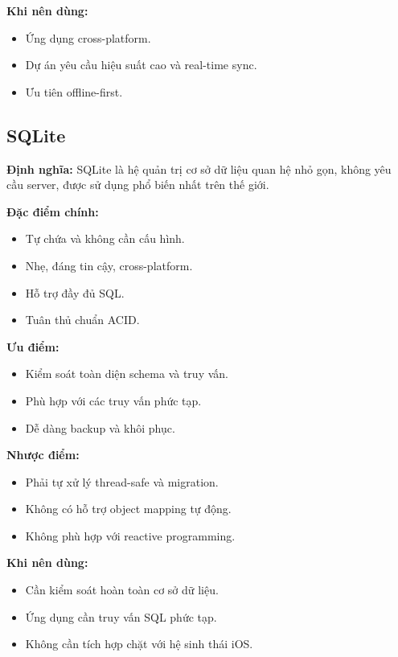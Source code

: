 \textbf{Khi nên dùng:}
\begin{itemize}
    \item Ứng dụng cross-platform.
    \item Dự án yêu cầu hiệu suất cao và real-time sync.
    \item Ưu tiên offline-first.
\end{itemize}

\subsection{SQLite}

\textbf{Định nghĩa:} SQLite là hệ quản trị cơ sở dữ liệu quan hệ nhỏ gọn, không yêu cầu server, được sử dụng phổ biến nhất trên thế giới.

\textbf{Đặc điểm chính:}
\begin{itemize}
    \item Tự chứa và không cần cấu hình.
    \item Nhẹ, đáng tin cậy, cross-platform.
    \item Hỗ trợ đầy đủ SQL.
    \item Tuân thủ chuẩn ACID.
\end{itemize}

\textbf{Ưu điểm:}
\begin{itemize}
    \item Kiểm soát toàn diện schema và truy vấn.
    \item Phù hợp với các truy vấn phức tạp.
    \item Dễ dàng backup và khôi phục.
\end{itemize}

\textbf{Nhược điểm:}
\begin{itemize}
    \item Phải tự xử lý thread-safe và migration.
    \item Không có hỗ trợ object mapping tự động.
    \item Không phù hợp với reactive programming.
\end{itemize}

\textbf{Khi nên dùng:}
\begin{itemize}
    \item Cần kiểm soát hoàn toàn cơ sở dữ liệu.
    \item Ứng dụng cần truy vấn SQL phức tạp.
    \item Không cần tích hợp chặt với hệ sinh thái iOS.
\end{itemize}

